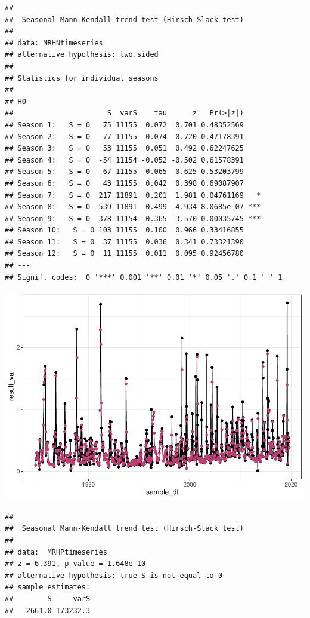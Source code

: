 \documentclass[12pt,]{article}
\begin{document}
\begin{verbatim}
## 
##  Seasonal Mann-Kendall trend test (Hirsch-Slack test)
## 
## data: MRHNtimeseries
## alternative hypothesis: two.sided
## 
## Statistics for individual seasons
## 
## H0
##                      S  varS    tau      z   Pr(>|z|)    
## Season 1:   S = 0   75 11155  0.072  0.701 0.48352569    
## Season 2:   S = 0   77 11155  0.074  0.720 0.47178391    
## Season 3:   S = 0   53 11155  0.051  0.492 0.62247625    
## Season 4:   S = 0  -54 11154 -0.052 -0.502 0.61578391    
## Season 5:   S = 0  -67 11155 -0.065 -0.625 0.53203799    
## Season 6:   S = 0   43 11155  0.042  0.398 0.69087907    
## Season 7:   S = 0  217 11891  0.201  1.981 0.04761169   *
## Season 8:   S = 0  539 11891  0.499  4.934 8.0685e-07 ***
## Season 9:   S = 0  378 11154  0.365  3.570 0.00035745 ***
## Season 10:   S = 0 103 11155  0.100  0.966 0.33416855    
## Season 11:   S = 0  37 11155  0.036  0.341 0.73321390    
## Season 12:   S = 0  11 11155  0.011  0.095 0.92456780    
## ---
## Signif. codes:  0 '***' 0.001 '**' 0.01 '*' 0.05 '.' 0.1 ' ' 1
\end{verbatim}

\includegraphics{Project_Template_files/figure-latex/unnamed-chunk-6-18.pdf}

\begin{verbatim}
## 
##  Seasonal Mann-Kendall trend test (Hirsch-Slack test)
## 
## data:  MRHPtimeseries
## z = 6.391, p-value = 1.648e-10
## alternative hypothesis: true S is not equal to 0
## sample estimates:
##        S     varS 
##   2661.0 173232.3
\end{verbatim}
\end{document}
